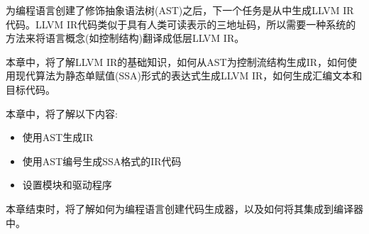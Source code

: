 
为编程语言创建了修饰抽象语法树(AST)之后，下一个任务是从中生成LLVM IR代码。LLVM IR代码类似于具有人类可读表示的三地址码，所以需要一种系统的方法来将语言概念(如控制结构)翻译成低层LLVM IR。

本章中，将了解LLVM IR的基础知识，如何从AST为控制流结构生成IR，如何使用现代算法为静态单赋值(SSA)形式的表达式生成LLVM IR，如何生成汇编文本和目标代码。

本章中，将了解以下内容:

\begin{itemize}
\item
使用AST生成IR

\item
使用AST编号生成SSA格式的IR代码

\item
设置模块和驱动程序
\end{itemize}

本章结束时，将了解如何为编程语言创建代码生成器，以及如何将其集成到编译器中。


